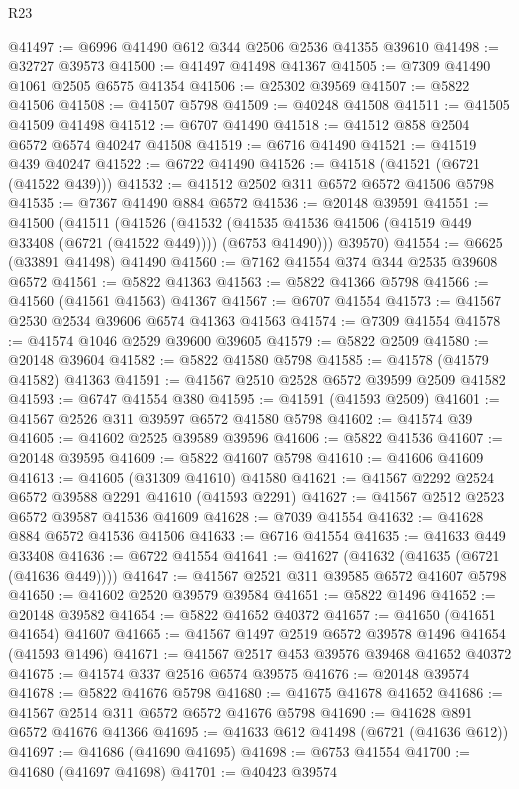\begin{lexlean}{R23}
\begin{coremodule}
@41497 := @6996 @41490 @612 @344 @2506 @2536 @41355 @39610
@41498 := @32727 @39573
@41500 := @41497 @41498 @41367
@41505 := @7309 @41490 @1061 @2505 @6575 @41354
@41506 := @25302 @39569
@41507 := @5822 @41506
@41508 := @41507 @5798
@41509 := @40248 @41508
@41511 := @41505 @41509 @41498
@41512 := @6707 @41490
@41518 := @41512 @858 @2504 @6572 @6574 @40247 @41508
@41519 := @6716 @41490
@41521 := @41519 @439 @40247
@41522 := @6722 @41490
@41526 := @41518 (@41521 (@6721 (@41522 @439)))
@41532 := @41512 @2502 @311 @6572 @6572 @41506 @5798
@41535 := @7367 @41490 @884 @6572
@41536 := @20148 @39591
@41551 := @41500
    (@41511
      (@41526
        (@41532 (@41535 @41536 @41506 (@41519 @449 @33408 (@6721 (@41522 @449)))) (@6753 @41490)))
      @39570)
@41554 := @6625 (@33891 @41498) @41490
@41560 := @7162 @41554 @374 @344 @2535 @39608 @6572
@41561 := @5822 @41363
@41563 := @5822 @41366 @5798
@41566 := @41560 (@41561 @41563) @41367
@41567 := @6707 @41554
@41573 := @41567 @2530 @2534 @39606 @6574 @41363 @41563
@41574 := @7309 @41554
@41578 := @41574 @1046 @2529 @39600 @39605
@41579 := @5822 @2509
@41580 := @20148 @39604
@41582 := @5822 @41580 @5798
@41585 := @41578 (@41579 @41582) @41363
@41591 := @41567 @2510 @2528 @6572 @39599 @2509 @41582
@41593 := @6747 @41554 @380
@41595 := @41591 (@41593 @2509)
@41601 := @41567 @2526 @311 @39597 @6572 @41580 @5798
@41602 := @41574 @39
@41605 := @41602 @2525 @39589 @39596
@41606 := @5822 @41536
@41607 := @20148 @39595
@41609 := @5822 @41607 @5798
@41610 := @41606 @41609
@41613 := @41605 (@31309 @41610) @41580
@41621 := @41567 @2292 @2524 @6572 @39588 @2291 @41610 (@41593 @2291)
@41627 := @41567 @2512 @2523 @6572 @39587 @41536 @41609
@41628 := @7039 @41554
@41632 := @41628 @884 @6572 @41536 @41506
@41633 := @6716 @41554
@41635 := @41633 @449 @33408
@41636 := @6722 @41554
@41641 := @41627 (@41632 (@41635 (@6721 (@41636 @449))))
@41647 := @41567 @2521 @311 @39585 @6572 @41607 @5798
@41650 := @41602 @2520 @39579 @39584
@41651 := @5822 @1496
@41652 := @20148 @39582
@41654 := @5822 @41652 @40372
@41657 := @41650 (@41651 @41654) @41607
@41665 := @41567 @1497 @2519 @6572 @39578 @1496 @41654 (@41593 @1496)
@41671 := @41567 @2517 @453 @39576 @39468 @41652 @40372
@41675 := @41574 @337 @2516 @6574 @39575
@41676 := @20148 @39574
@41678 := @5822 @41676 @5798
@41680 := @41675 @41678 @41652
@41686 := @41567 @2514 @311 @6572 @6572 @41676 @5798
@41690 := @41628 @891 @6572 @41676 @41366
@41695 := @41633 @612 @41498 (@6721 (@41636 @612))
@41697 := @41686 (@41690 @41695)
@41698 := @6753 @41554
@41700 := @41680 (@41697 @41698)
@41701 := @40423 @39574

\end{coremodule}
\end{lexlean}
